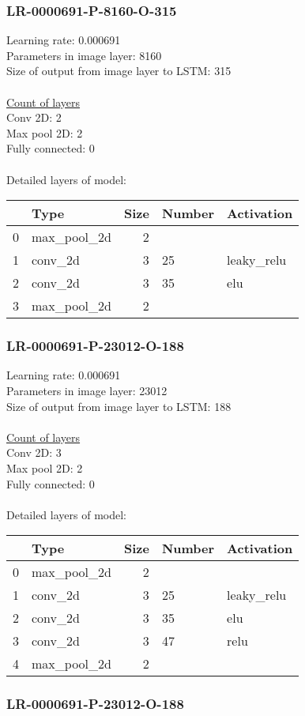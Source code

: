 \subsubsection*{LR-0000691-P-8160-O-315}
Learning rate: 0.000691
\\Parameters in image layer: 8160
\\Size of output from image layer to LSTM: 315
\\\\\underline{Count of layers} 
\\Conv 2D:           2\\Max pool 2D:      2\\Fully connected:  0
\\\\Detailed layers of model: \\\begin{tabular}{rlrll}
\hline
    & Type        &   Size & Number   & Activation   \\
\hline
  0 & max\_pool\_2d &      2 &          &              \\
  1 & conv\_2d     &      3 & 25       & leaky\_relu   \\
  2 & conv\_2d     &      3 & 35       & elu          \\
  3 & max\_pool\_2d &      2 &          &              \\
\hline
\end{tabular}\subsubsection*{LR-0000691-P-23012-O-188}
Learning rate: 0.000691
\\Parameters in image layer: 23012
\\Size of output from image layer to LSTM: 188
\\\\\underline{Count of layers} 
\\Conv 2D:           3\\Max pool 2D:      2\\Fully connected:  0
\\\\Detailed layers of model: \\\begin{tabular}{rlrll}
\hline
    & Type        &   Size & Number   & Activation   \\
\hline
  0 & max\_pool\_2d &      2 &          &              \\
  1 & conv\_2d     &      3 & 25       & leaky\_relu   \\
  2 & conv\_2d     &      3 & 35       & elu          \\
  3 & conv\_2d     &      3 & 47       & relu         \\
  4 & max\_pool\_2d &      2 &          &              \\
\hline
\end{tabular}\subsubsection*{LR-0000691-P-23012-O-188}
